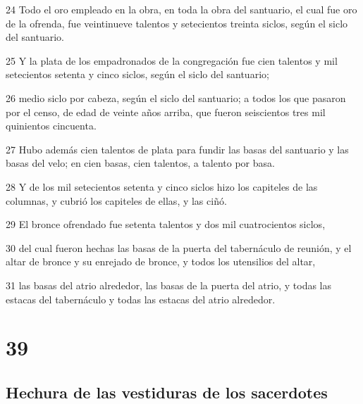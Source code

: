 \par 24 Todo el oro empleado en la obra, en toda la obra del santuario, el cual fue oro de la ofrenda, fue veintinueve talentos   y setecientos treinta siclos, según el siclo del santuario.
\par 25 Y la plata de los empadronados de la congregación fue cien talentos   y mil setecientos setenta y cinco siclos, según el siclo del santuario;
\par 26 medio siclo por cabeza, según el siclo del santuario; a todos los que pasaron por el censo, de edad de veinte años arriba, que fueron seiscientos tres mil quinientos cincuenta.
\par 27 Hubo además cien talentos de plata   para fundir las basas del santuario y las basas del velo; en cien basas, cien talentos, a talento por basa.
\par 28 Y de los mil setecientos setenta y cinco siclos   hizo los capiteles de las columnas, y cubrió los capiteles de ellas, y las ciñó.
\par 29 El bronce ofrendado fue setenta talentos   y dos mil cuatrocientos siclos,
\par 30 del cual fueron hechas las basas de la puerta del tabernáculo de reunión, y el altar de bronce y su enrejado de bronce, y todos los utensilios del altar,
\par 31 las basas del atrio alrededor, las basas de la puerta del atrio, y todas las estacas del tabernáculo y todas las estacas del atrio alrededor.

\chapter{39}

\section*{Hechura de las vestiduras de los sacerdotes}

